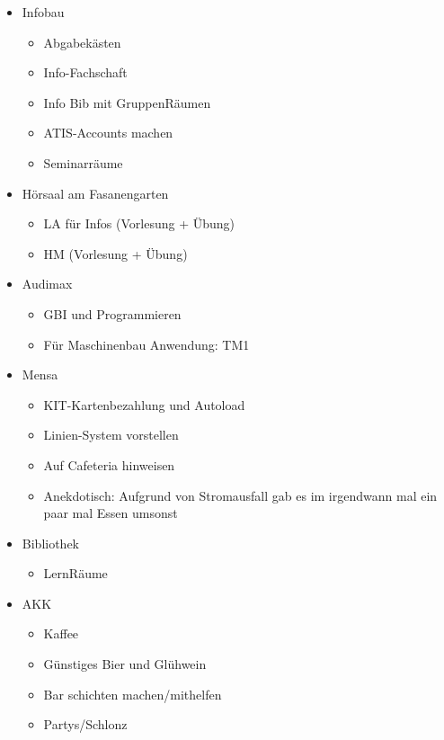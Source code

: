 \documentclass[10pt,ngerman]{scrartcl}
\begin{document}
\begin{multicols}{2}
\begin{itemize}
    \item Infobau
        \begin{itemize}
            \item Abgabekästen
            \item Info-Fachschaft
            \item Info Bib mit GruppenRäumen
            \item ATIS-Accounts machen
            \item Seminarräume
        \end{itemize}
    \item Hörsaal am Fasanengarten
        \begin{itemize}
            \item LA für Infos (Vorlesung + Übung)
            \item HM (Vorlesung + Übung)
        \end{itemize}
    \item Audimax
        \begin{itemize}
            \item GBI und Programmieren
            \item Für Maschinenbau Anwendung: TM1
        \end{itemize}
    \item Mensa
        \begin{itemize}
            \item KIT-Kartenbezahlung und Autoload
            \item Linien-System vorstellen
            \item Auf Cafeteria hinweisen
            \item Anekdotisch: Aufgrund von Stromausfall gab es im irgendwann mal ein paar mal Essen umsonst
        \end{itemize}
    \item Bibliothek
        \begin{itemize}
            \item LernRäume
        \end{itemize}
    \item AKK
        \begin{itemize}
            \item Kaffee
            \item Günstiges Bier und Glühwein
            \item Bar schichten machen/mithelfen
            \item Partys/Schlonz

\end{itemize}
\end{itemize}
\end{multicols}
\end{document}
